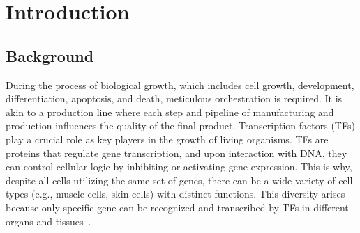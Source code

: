 \documentclass{PHlab-thesis}
\begin{document}


\renewcommand\nomgroup[1]{%
  \item[\bfseries
  \ifstrequal{#1}{A}{General}{%
  \ifstrequal{#1}{Z}{Gene/Protein Names}%
  }]}





\printnomenclature[5cm]

\newpage
\setcounter{page}{1}


\chapter{Introduction}
\section{Background}
During the process of biological growth, which includes cell growth, development, differentiation, apoptosis, and death, meticulous orchestration is required. It is akin to a production line where each step and pipeline of manufacturing and production influences the quality of the final product. Transcription factors (TFs) play a crucial role as key players in the growth of living organisms. TFs are proteins that regulate gene transcription, and upon interaction with DNA, they can control cellular logic by inhibiting or activating gene expression. This is why, despite all cells utilizing the same set of genes, there can be a wide variety of cell types (e.g., muscle cells, skin cells) with distinct functions. This diversity arises because only specific gene can be recognized and transcribed by TFs in different organs and tissues~\cite{lambert2018human}.
\end{document}
